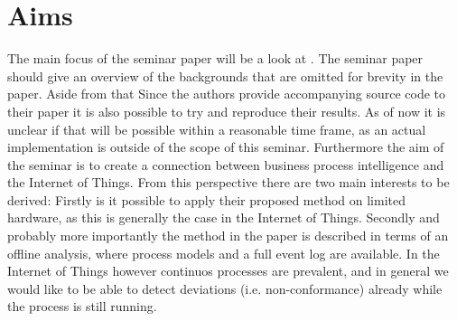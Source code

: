 \documentclass[runningheads]{template/llncs}
\begin{document}
\section{Aims}
The main focus of the seminar paper will be a look at \cite{PBWe20}. The seminar paper should give an overview of the backgrounds that are omitted for brevity in the paper.
Aside from that 
Since the authors provide accompanying source code to their paper it is also possible to try and reproduce their results.
As of now it is unclear if that will be possible within a reasonable time frame, as an actual implementation is outside of the scope of this seminar.
Furthermore the aim of the seminar is to create a connection between business process intelligence and the Internet of Things. From this perspective there are two main interests to be derived: Firstly is it possible to apply their proposed method on limited hardware, as this is generally the case in the Internet of Things.  %
Secondly and probably more importantly the method in the paper is described in terms of an offline analysis, where process models and a full event log are available. In the Internet of Things however continuos processes are prevalent, and in general we would like to be able to detect deviations (i.e. non-conformance) already while the process is still running.
%
%
%


%
\end{document}

